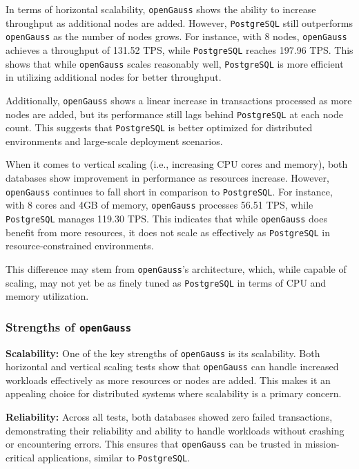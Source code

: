 \documentclass[12pt,a4paper,cs4size]{ctexart}
\begin{document}
In terms of horizontal scalability, \texttt{openGauss} shows the ability to increase throughput as additional nodes are added. However, \texttt{PostgreSQL} still outperforms \texttt{openGauss} as the number of nodes grows. For instance, with 8 nodes, \texttt{openGauss} achieves a throughput of 131.52 TPS, while \texttt{PostgreSQL} reaches 197.96 TPS. This shows that while \texttt{openGauss} scales reasonably well, \texttt{PostgreSQL} is more efficient in utilizing additional nodes for better throughput.

Additionally, \texttt{openGauss} shows a linear increase in transactions processed as more nodes are added, but its performance still lags behind \texttt{PostgreSQL} at each node count. This suggests that \texttt{PostgreSQL} is better optimized for distributed environments and large-scale deployment scenarios.

When it comes to vertical scaling (i.e., increasing CPU cores and memory), both databases show improvement in performance as resources increase. However, \texttt{openGauss} continues to fall short in comparison to \texttt{PostgreSQL}. For instance, with 8 cores and 4GB of memory, \texttt{openGauss} processes 56.51 TPS, while \texttt{PostgreSQL} manages 119.30 TPS. This indicates that while \texttt{openGauss} does benefit from more resources, it does not scale as effectively as \texttt{PostgreSQL} in resource-constrained environments.

This difference may stem from \texttt{openGauss}'s architecture, which, while capable of scaling, may not yet be as finely tuned as \texttt{PostgreSQL} in terms of CPU and memory utilization.

\subsubsection*{Strengths of \texttt{openGauss}}

\textbf{Scalability:} One of the key strengths of \texttt{openGauss} is its scalability. Both horizontal and vertical scaling tests show that \texttt{openGauss} can handle increased workloads effectively as more resources or nodes are added. This makes it an appealing choice for distributed systems where scalability is a primary concern.

\textbf{Reliability:} Across all tests, both databases showed zero failed transactions, demonstrating their reliability and ability to handle workloads without crashing or encountering errors. This ensures that \texttt{openGauss} can be trusted in mission-critical applications, similar to \texttt{PostgreSQL}.
\end{document}
